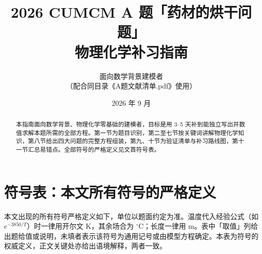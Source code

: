 \documentclass[12pt,a4paper]{ctexart}
\title{\bfseries 2026 CUMCM A 题「药材的烘干问题」\\物理化学补习指南}
\author{面向数学背景建模者\\（配合同目录《A题文献清单.pdf》使用）}
\date{2026 年 9 月}
\begin{document}
\maketitle

\begin{abstract}
本指南面向数学背景、物理化学零基础的建模者，目标是用 3--5 天补到能独立写出并数值求解本题所需的全部方程。第一节为题目识别，第二至七节按关键词讲解物理化学知识，第八节给出四大问题的完整方程组装，第九、十节为验证清单与补习路线图，第十一节汇总易错点。全部符号的严格定义见文首符号表。
\end{abstract}

\tableofcontents
\newpage

\section*{符号表：本文所有符号的严格定义}

本文出现的所有符号严格定义如下，单位以题面约定为准。温度代入经验公式（如 $e^{-3850/T}$）时一律用开尔文 K，其余场合为 $^\circ$C；长度一律用 m。表中「取值」列给出题给值或说明，未填者表示该符号为通用记号或由模型方程确定。本表为符号的权威定义，正文关键处亦给出语境解释，两者一致。
\end{document}
